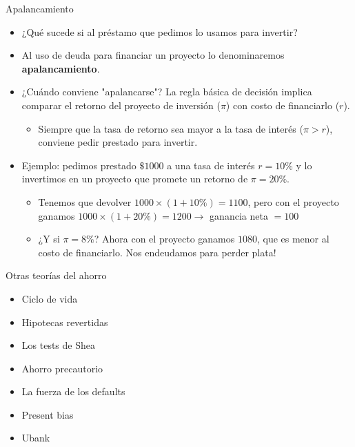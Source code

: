 \documentclass{beamer}
\begin{document}
\begin{frame}{Apalancamiento}
   \begin{itemize}
       \item ¿Qué sucede si al préstamo que pedimos lo usamos para invertir?
       \item Al uso de deuda para financiar un proyecto lo denominaremos \textbf{apalancamiento}.
       \item ¿Cuándo conviene "apalancarse"? La regla básica de decisión implica comparar el retorno del proyecto de inversión ($\pi$) con costo de financiarlo ($r$).
          \begin{itemize}
       \item \textcolor{blue!70!black}{Siempre que la tasa de retorno sea mayor a la tasa de interés ($\pi>r$), conviene pedir prestado para invertir.} 
          \end{itemize} 
       \item Ejemplo: pedimos prestado $\$1000$ a una tasa de interés $r=10\%$ y lo invertimos en un proyecto que promete un retorno de $\pi=20\%$.
          \begin{itemize}
        \item Tenemos que devolver $1000\times(1+10\%)=1100$, pero con el proyecto ganamos $1000\times(1+20\%)=1200\rightarrow$ ganancia neta $=100$  
       \item ¿Y si $\pi=8\%$? Ahora con el proyecto ganamos $1080$, que es menor al costo de financiarlo. Nos endeudamos para perder plata!
          \end{itemize} 
   \end{itemize} 
\end{frame}


\begin{frame}{Otras teorías del ahorro}
   \begin{itemize}
       \item Ciclo de vida
       \item Hipotecas revertidas
       \item Los tests de Shea
       \item Ahorro precautorio
       \item La fuerza de los defaults
       \item Present bias
       \item Ubank
   \end{itemize} 
\end{frame}
\end{document}
